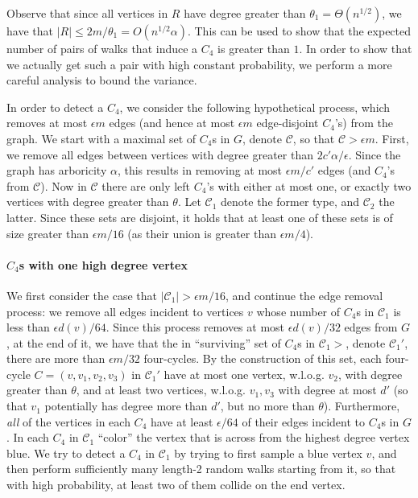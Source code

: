 \documentclass{article}
\newcommand{\eps}{\epsilon}
\newcommand{\calC}{{\mathcal{C}}}
\newcommand{\commentt}[1]{ {}}
\begin{document}
Observe that since all vertices in $R$ have degree greater than $\theta_1 = \Theta(n^{1/2})$, we have that $|R| \leq 2m/\theta_1 = O(n^{1/2}\alpha)$. This can be used to show that the expected number of pairs of walks that induce a $C_4$ is greater than $1$. In order to show that we actually get such a pair with high constant probability, we perform a more careful analysis to bound the variance. 


\iffalse
In order to detect a $C_4$, we consider the following hypothetical process, which removes at most $\eps m$ edges (and hence at most $\eps m$ edge-disjoint $C_4$'s) from the graph. 
We start with a maximal set of $C_4$s in $G$, denote $\calC$, so that $\calC>\eps m$.
First, we remove all edges between vertices with degree greater than  $2c'\alpha/\epsilon$. Since the graph has arboricity $\alpha$, this results in removing at most $\eps m/c'$ edges (and $C_4$'s from $\calC$).  Now in  $\calC$  there are only left $C_4$'s with either at most one, or exactly two vertices with degree greater than $\theta$. \commentt{introduce $\theta$} Let $\calC_1$ denote the former type, and $\calC_2$ the latter. Since these sets are disjoint, it holds that at least one of these sets is of size greater than $\eps m/16$ (as their union is greater than $\eps m/4$).

\paragraph{$C_4$s with one high degree vertex}
We first consider the case that $|\calC_1|>\eps m/16$, and continue the edge removal process: we remove all edges incident to vertices $v$ whose number of $C_4$s in $\calC_1$ is less than $\eps d(v)/64$. Since this process removes at most $\eps d(v)/32$ edges from $G$, at the end of it, we have that the in  ``surviving'' set of $C_4$s in $\calC_1>$, denote $\calC_1'$, there are more than $\eps m/32$ four-cycles. By the construction of this set, each four-cycle $C=(v,v_1, v_2, v_3)$ in $\calC_1'$ 
have at most one vertex, w.l.o.g. $v_2$,  with degree greater than  $\theta$, and at least two vertices, w.l.o.g. $v_1,v_3$ with degree at most $d'$ (so that $v_1$ potentially has degree more than $d'$, but no more than $\theta$).
Furthermore,  \emph{all} of the vertices in each $C_4$ have at least $\eps/64$ of their edges incident to $C_4$s in $G$.  In each $C_4$  in $\calC_1$ ``color'' the vertex that is across from the highest degree vertex blue. 
We try to detect a $C_4$ in $\calC_1$ by trying to first  sample  a blue vertex $v$, and then perform sufficiently many length-2 random walks starting from it, so that with high probability, at least two of them collide on the end vertex. 
\end{document}
